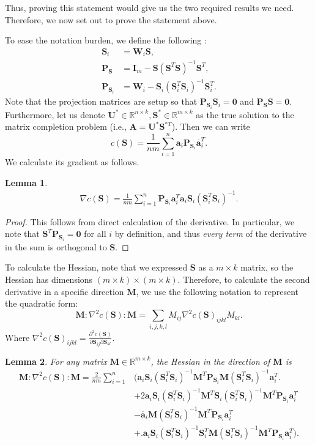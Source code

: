 \documentclass[twoside,11pt]{article}
\newcommand{\md}[1]{\mathbb{#1}}
\newtheorem{lem}{Lemma}
\begin{document}
Thus, proving this statement would give us the two required results we need. Therefore, we now set out to prove the statement above. 

To ease the notation burden, we  define the following :
\begin{align*}
\bm{S}_i&=\bm{W}_i\bm{S},\\
\bm{P}_{\bm{S}}&=\bm{I}_m - \bm{S}(\bm{S}^T\bm{S})^{-1}\bm{S}^T,\\
\bm{P}_{\bm{S}_i}&=\bm{W}_i - \bm{S}_i(\bm{S}_i^T\bm{S}_i)^{-1}\bm{S}_i^T.
\end{align*}
Note that the projection matrices are setup so that $\bm{P}_{\bm{S}_i}\bm{S}_i=\bm{0}$ and $\bm{P}_{\bm{S}}\bm{S}=\bm{0}$. Furthermore, let us denote $\bm{U}^*\in \md{R}^{n \times k},\bm{S}^*\in \md{R}^{m \times k}$ as the true solution to the matrix completion problem (i.e., $\bm{A}=\bm{U}^*\bm{S}^{*T}$). Then we can write 
\begin{equation}
c(\bm{S})= \frac{1}{nm}\sum_{i=1}^n  \bm{a}_i\bm{P}_{\bm{S}_i}\overline{\bm{a}}_i^T. \label{eq:objective} 
\end{equation}
We calculate its gradient  as follows.
\begin{lem}
	\label{lem:first_deriv}
	\begin{align*}
	\nabla c(\bm{S}) = \frac{1}{nm}\sum_{i=1}^n  \bm{P}_{\bm{S}_i}\bm{a}_i^T\bm{a}_i\bm{S}_i(\bm{S}_i^T\bm{S}_i)^{-1}.
	\end{align*}
\end{lem}
\begin{proof}
	This follows from direct calculation of the derivative. In particular, we note that $\bm{S}^T\bm{P}_{\bm{S}_i}=\bm{0}$ for all $i$ by definition, and thus \emph{every term} of the derivative in the sum is orthogonal to $\bm{S}$. 
\end{proof}
To calculate the Hessian, note that we expressed   $\bm{S}$ as a $m\times k$ matrix, so the Hessian has  dimensions $(m\times k) \times (m \times k)$. Therefore, to calculate the second derivative in a specific direction $\bm{M}$, we   use  the following notation  to represent the quadratic form: 
\[\bm{M} : \nabla ^2 c(\bm{S}): \bm{M}=\sum_{i,j,k,l} M_{ij}\nabla^2 c(\bm{S})_{ijkl}M_{kl}.\] 
Where $\nabla^2 c(\bm{S})_{ijkl}=\frac{\partial^2 c(\bm{S})}{\partial \bm{S}_{ij} \partial \bm{S}_{kl}}$.    
\begin{lem}
	\label{lem:second_deriv}
	For any matrix $\bm{M}\in \md{R}^{m \times k}$, the Hessian in the direction of $\bm{M}$ is
	\begin{align*}
	\bm{M} : \nabla ^2 c(\bm{S}): \bm{M}= \frac{2}{nm} \sum_{i=1}^n &\biggl( \bm{a}_i\bm{S}_i(\bm{S}_i^T\bm{S}_i)^{-1}\bm{M}^T\bm{P}_{\bm{S}_i}\bm{M} (\bm{S}_i^T\bm{S}_i)^{-1}\bm{a}_i^T\biggr.\\&+2\bm{a}_i\bm{S}_i(\bm{S}_i^T\bm{S}_i)^{-1}\bm{M}^T\bm{S}_i(\bm{S}_i^T\bm{S}_i)^{-1}\bm{M}^T\bm{P}_{\bm{S}_i}\bm{a}_i^T\\& -  \overline{\bm{a}}_i \bm{M}(\bm{S}_i^T\bm{S}_i)^{-1}\bm{M}^T \bm{P}_{\bm{S}_i} \bm{a}_i^T\\&+\biggl.\bm{a}_i\bm{S}_i(\bm{S}_i^T\bm{S}_i)^{-1} \bm{S}^T_i\bm{M}(\bm{S}_i^T\bm{S}_i)^{-1}\bm{M}^T\bm{P}_{\bm{S}_i}\bm{a}_i^T\biggr).
	\end{align*}
\end{lem}
\end{document}
